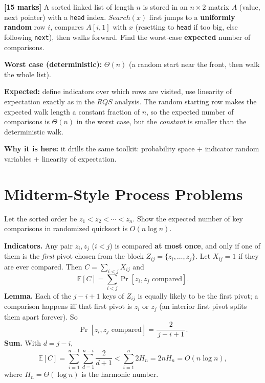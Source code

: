 \documentclass[11pt]{article}
\begin{document}
\begin{exambox}
\textbf{[15 marks]} A sorted linked list of length $n$ is stored in an $n \times 2$ matrix $A$ (value, next pointer) with a \texttt{head} index. $Search(x)$ first jumps to a \textbf{uniformly random} row $i$, compares $A[i,1]$ with $x$ (resetting to \texttt{head} if too big, else following \texttt{next}), then walks forward. Find the worst-case \textbf{expected} number of comparisons.

\begin{answerband}
\textbf{Worst case (deterministic):} $\Theta(n)$ (a random start near the front, then walk the whole list).

\textbf{Expected:} define indicators over which rows are visited, use linearity of expectation exactly as in the $RQS$ analysis. The random starting row makes the expected walk length a constant fraction of $n$, so the expected number of comparisons is \textcolor{violetT}{$\Theta(n)$} in the worst case, but the \emph{constant} is smaller than the deterministic walk.

\smallskip
\textcolor{heapblue}{\textbf{Why it is here:}} it drills the same toolkit: probability space $+$ indicator random variables $+$ linearity of expectation.
\end{answerband}
\end{exambox}

\section{Midterm-Style Process Problems}

\begin{examplebox}
Let the sorted order be $z_1<z_2<\cdots<z_n$. Show the expected number of key comparisons in randomized quicksort is $O(n\log n)$.

\begin{answerband}
\textbf{Indicators.} Any pair $z_i,z_j$ ($i<j$) is compared \textbf{at most once}, and only if one of them is the \emph{first} pivot chosen from the block $Z_{ij}=\{z_i,\dots,z_j\}$. Let $X_{ij}=1$ if they are ever compared. Then $C=\sum_{i<j}X_{ij}$ and
\[
  \mathbb{E}[C]=\sum_{i<j}\Pr[z_i,z_j\text{ compared}].
\]
\textbf{Lemma.} Each of the $j-i+1$ keys of $Z_{ij}$ is equally likely to be the first pivot; a comparison happens iff that first pivot is $z_i$ or $z_j$ (an interior first pivot splits them apart forever). So
\[
  \Pr[z_i,z_j\text{ compared}]=\frac{2}{\,j-i+1\,}.
\]
\textbf{Sum.} With $d=j-i$,
\[
  \mathbb{E}[C]=\sum_{i=1}^{n-1}\sum_{d=1}^{n-i}\frac{2}{d+1}<\sum_{i=1}^{n}2H_n=2nH_n=O(n\log n),
\]
where $H_n=\Theta(\log n)$ is the harmonic number.
\end{answerband}
\end{examplebox}
\end{document}
